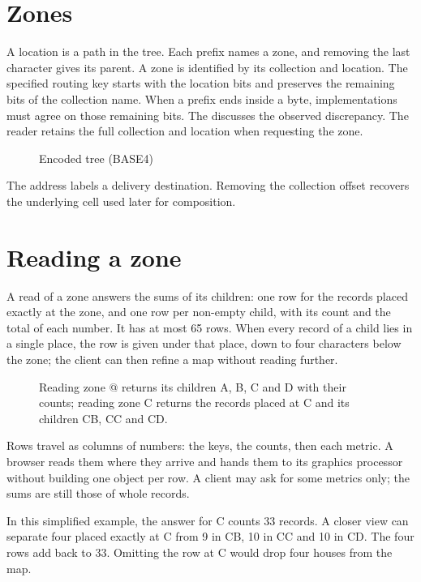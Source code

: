\documentclass[11pt]{article}
\begin{document}
\section{Zones}
A location is a path in the tree. Each prefix names a zone, and removing the last character gives its parent. A zone is identified by its collection and location. The specified routing key starts with the location bits and preserves the remaining bits of the collection name. When a prefix ends inside a byte, implementations must agree on those remaining bits. The  discusses the observed discrepancy. The reader retains the full collection and location when requesting the zone.

\begin{figure}[H]
    \centering
    \caption{Encoded tree (BASE4)}
\end{figure}

The address labels a delivery destination. Removing the collection offset recovers the underlying cell used later for composition.

\section{Reading a zone}\hypertarget{ix:zone-read}{}
A read of a zone answers the sums of its children: one row for the records placed exactly at the zone, and one row per non-empty child, with its count and the total of each number. It has at most 65 rows. When every record of a child lies in a single place, the row is given under that place, down to four characters below the zone; the client can then refine a map without reading further.

\begin{figure}[H]
    \centering
    \caption{Reading zone @ returns its children A, B, C and D with their counts; reading zone C returns the records placed at C and its children CB, CC and CD.}
\end{figure}

Rows travel as columns of numbers: the keys, the counts, then each metric. A browser reads them where they arrive and hands them to its graphics processor without building one object per row. A client may ask for some metrics only; the sums are still those of whole records.

In this simplified example, the answer for C counts 33 records. A closer view can separate four placed exactly at C from 9 in CB, 10 in CC and 10 in CD. The four rows add back to 33. Omitting the row at C would drop four houses from the map.
\end{document}
